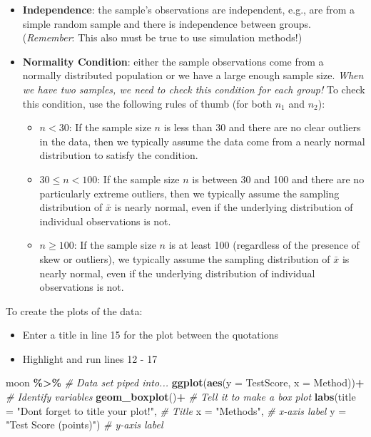 \documentclass[
]{report}
\newenvironment{Shaded}{\begin{snugshade}}{\end{snugshade}}
\newcommand{\AttributeTok}[1]{\textcolor[rgb]{0.13,0.29,0.53}{#1}}
\newcommand{\CommentTok}[1]{\textcolor[rgb]{0.56,0.35,0.01}{\textit{#1}}}
\newcommand{\FunctionTok}[1]{\textcolor[rgb]{0.13,0.29,0.53}{\textbf{#1}}}
\newcommand{\NormalTok}[1]{#1}
\newcommand{\SpecialCharTok}[1]{\textcolor[rgb]{0.81,0.36,0.00}{\textbf{#1}}}
\newcommand{\StringTok}[1]{\textcolor[rgb]{0.31,0.60,0.02}{#1}}
\begin{document}
\begin{itemize}
\item
  \textbf{Independence}: the sample's observations are independent, e.g., are from a simple random sample and there is independence between groups. (\emph{Remember}: This also must be true to use simulation methods!)
\item
  \textbf{Normality Condition}: either the sample observations come from a normally distributed population or we have a large enough sample size. \emph{When we have two samples, we need to check this condition for each group!} To check this condition, use the following rules of thumb (for both \(n_1\) and \(n_2\)):

  \begin{itemize}
  \item
    \(n < 30\): If the sample size \(n\) is less than 30 and there are no clear outliers in the data, then we typically assume the data come from a nearly normal distribution to satisfy the condition.
  \item
    \(30 \le n < 100\): If the sample size \(n\) is between 30 and 100 and there are no particularly extreme outliers, then we typically assume the sampling distribution of \(\bar{x}\) is nearly normal, even if the underlying distribution of individual observations is not.
  \item
    \(n \geq 100\): If the sample size \(n\) is at least 100 (regardless of the presence of skew or outliers), we typically assume the sampling distribution of \(\bar{x}\) is nearly normal, even if the underlying distribution of individual observations is not.
  \end{itemize}
\end{itemize}

To create the plots of the data:

\begin{itemize}
\item
  Enter a title in line 15 for the plot between the quotations
\item
  Highlight and run lines 12 - 17
\end{itemize}

\begin{Shaded}
\begin{Highlighting}[]
\NormalTok{moon }\SpecialCharTok{\%\textgreater{}\%}  \CommentTok{\# Data set piped into...}
  \FunctionTok{ggplot}\NormalTok{(}\FunctionTok{aes}\NormalTok{(}\AttributeTok{y =}\NormalTok{ TestScore, }\AttributeTok{x =}\NormalTok{ Method))}\SpecialCharTok{+}  \CommentTok{\# Identify variables}
  \FunctionTok{geom\_boxplot}\NormalTok{()}\SpecialCharTok{+}  \CommentTok{\# Tell it to make a box plot}
  \FunctionTok{labs}\NormalTok{(}\AttributeTok{title =} \StringTok{"Don\textquotesingle{}t forget to title your plot!"}\NormalTok{,  }\CommentTok{\# Title}
       \AttributeTok{x =} \StringTok{"Methods"}\NormalTok{,    }\CommentTok{\# x{-}axis label}
       \AttributeTok{y =} \StringTok{"Test Score (points)"}\NormalTok{)  }\CommentTok{\# y{-}axis label}
\end{Highlighting}
\end{Shaded}
\end{document}
